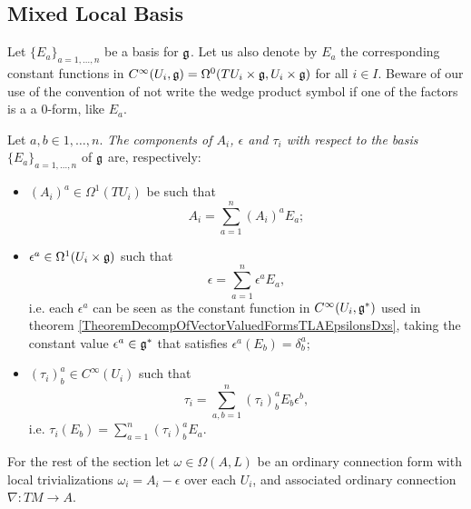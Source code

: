 \subsection{Mixed Local Basis}
Let $\{E_a\}_{a = 1, \dots, n}$ be a basis for $\mathfrak{g}$. Let us also denote by $E_a$ the corresponding constant functions in $C^\infty(U_i, \mathfrak{g}) = \Omega^0(TU_i \times \mathfrak{g}, U_i \times \mathfrak{g})$ for all $i \in I$. Beware of our use of the convention of not write the wedge product symbol if one of the factors is a a $0$-form, like $E_a$.

\begin{definition}
    Let $a, b \in 1, \dots, n$. \emph{The components of $A_i$, $\epsilon$ and $\tau_i$ with respect to the basis $\{E_a\}_{a = 1, \dots, n}$} of $\mathfrak{g}$ are, respectively: 
    
        \begin{itemize}
        
        \item $(A_i)^a \in \Omega^1(TU_i)$ be such that
            \begin{equation}
                A_i = \sum_{a = 1}^n (A_i)^a E_a;
            \end{equation}
        
        \item $\epsilon^a \in \Omega^1(U_i \times \alg g)$ such that
            \begin{equation}
                \epsilon = \sum_{a = 1}^n \epsilon^a E_a,
            \end{equation}
        i.e. each $\epsilon^a$ can be seen as the constant function in $C^\infty(U_i, \mathfrak{g}^*)$ used in theorem \ref{TheoremDecompOfVectorValuedFormsTLAEpsilonsDxs}, taking the constant value $\epsilon^a \in \alg g^*$ that satisfies $\epsilon^a(E_b) = \delta^a_b$;
        
        \item $(\tau_i)^a_b \in C^\infty(U_i)$ such that
            \begin{equation}
                \tau_i = \sum_{a, b = 1}^n (\tau_i)^a_b E_b \epsilon^b,
            \end{equation}
        i.e. $\tau_i(E_b) = \sum_{a = 1}^n (\tau_i)^a_b E_a$.
        \end{itemize}
\end{definition}

For the rest of the section let $\omega \in \Omega(A, L)$ be an ordinary connection form with local trivializations $\omega_i = A_i - \epsilon$ over each $U_i$, and associated ordinary connection $\nabla: TM \to A$.

